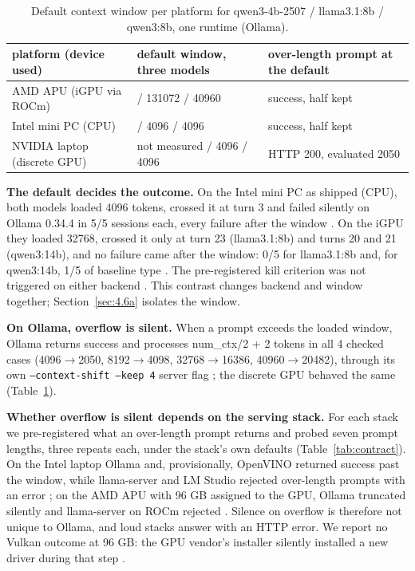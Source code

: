 \documentclass[conference,10pt]{IEEEtran}
\begin{document}
\begin{table}[t]
\caption{Default context window per platform for qwen3-4b-2507 / llama3.1:8b / qwen3:8b, one runtime (Ollama).}
\label{tab:defaults}
\centering\footnotesize
\begin{tabular}{@{}>{\raggedright\arraybackslash}p{}>{\raggedright\arraybackslash}p{}>{\raggedright\arraybackslash}p{}@{}}
\toprule
platform (device used) & default window, three models & over-length prompt at the default \\
\midrule
AMD APU (iGPU via ROCm) & 262144 / 131072 / 40960  & success, half kept  \\
Intel mini PC (CPU) & 4096 / 4096 / 4096  & success, half kept  \\
NVIDIA laptop (discrete GPU) & not measured / 4096 / 4096  & HTTP 200, evaluated 2050  \\
\bottomrule
\end{tabular}
\end{table}

\textbf{The default decides the outcome.} On the Intel mini PC as shipped (CPU), both models loaded 4096 tokens, crossed it at turn 3 and failed silently on Ollama 0.34.4 in 5/5 sessions each, every failure after the window%
. On the iGPU they loaded 32768, crossed it only at turn 23 (llama3.1:8b) and turns 20 and 21 (qwen3:14b), and no failure came after the window: 0/5 for llama3.1:8b and, for qwen3:14b, 1/5 of baseline type%
. The pre-registered kill criterion was not triggered on either backend%
. This contrast changes backend and window together; Section~\ref{sec:4.6a} isolates the window.

\textbf{On Ollama, overflow is silent.} When a prompt exceeds the loaded window, Ollama returns success and processes num\_ctx/2 + 2 tokens in all 4 checked cases (4096$\rightarrow$2050, 8192$\rightarrow$4098, 32768$\rightarrow$16386, 40960$\rightarrow$20482), through its own \texttt{--context-shift --keep 4} server flag%
; the discrete GPU behaved the same (Table~\ref{tab:defaults}).

\textbf{Whether overflow is silent depends on the serving stack.} For each stack we pre-registered what an over-length prompt returns and probed seven prompt lengths, three repeats each, under the stack's own defaults (Table~\ref{tab:contract}). On the Intel laptop Ollama and, provisionally, OpenVINO returned success past the window, while llama-server and LM Studio rejected over-length prompts with an error%
; on the AMD APU with 96 GB assigned to the GPU, Ollama truncated silently and llama-server on ROCm rejected%
. Silence on overflow is therefore not unique to Ollama, and loud stacks answer with an HTTP error. We report no Vulkan outcome at 96 GB: the GPU vendor's installer silently installed a new driver during that step%
.
\end{document}
